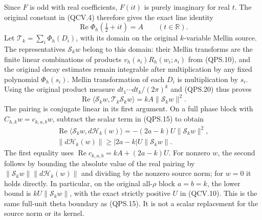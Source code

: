 Since \(F\) is odd with real coefficients, \(F(it)\) is purely
imaginary for real \(t\). The original constant in (QCV.4) therefore
gives the exact line identity
\[
 \operatorname{Re}\Phi_h(\tfrac12+it)=A
                     \qquad(t\in\mathbb{R}).
 \tag{QPS.20}
\]
Let \(\mathcal T_k=\sum_i\Phi_h(D_i)\), with its domain on the
original \(k\)-variable Mellin source. The representatives
\(\mathcal S_k w\) belong to this domain: their Mellin transforms
are the finite linear combinations of products
\(v_h(s_i)R_h(w_i;s_i)\) from (QPS.10), and the original decay
estimates remain integrable after multiplication by any fixed
polynomial \(\Phi_h(s_i)\).
Mellin transformation of each \(D_i\) is multiplication by \(s_i\).
Using the original product measure \(dt_1\cdots dt_k/(2\pi)^k\)
and (QPS.20) thus proves
\[
 \operatorname{Re}
 \langle\mathcal S_k w,\mathcal T_k\mathcal S_k w\rangle
     =kA\|\mathcal S_k w\|^2.
 \tag{QPS.21}
\]
The pairing is conjugate linear in its first argument.
On a full phase block with \(C_{h,k}w=c_{k,a,b}w\), subtract
the scalar term in (QPS.15) to obtain
\[
 \begin{gathered}
 \operatorname{Re}
 \langle\mathcal S_k w,d\mathcal H_k(w)\rangle
       =-(2a-k)U\|\mathcal S_k w\|^2,\\
 \|d\mathcal H_k(w)\|
       \geq |2a-k|U\|\mathcal S_k w\|.
 \end{gathered}
 \tag{QPS.22}
\]
The first equality uses
\(\operatorname{Re}c_{k,a,b}=kA+(2a-k)U\). For nonzero \(w\),
the second follows by bounding the absolute value of the real
pairing by
\(\|\mathcal S_k w\|\|d\mathcal H_k(w)\|\) and dividing by the
nonzero source norm; for \(w=0\) it holds directly. In particular,
on the original all-\(\rho\) block \(a=b=k\), the lower bound is
\(kU\|\mathcal S_k w\|\), with the exact strictly positive \(U\)
in (QCV.10). This is the same full-unit theta boundary as (QPS.15).
It is not a scalar replacement for the source norm or its kernel.

